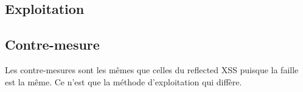 \subsection{Exploitation}

\subsection{Contre-mesure}

Les contre-mesures sont les mêmes que celles du reflected XSS puisque la faille est la même. Ce  n'est que la méthode d'exploitation qui diffère.


